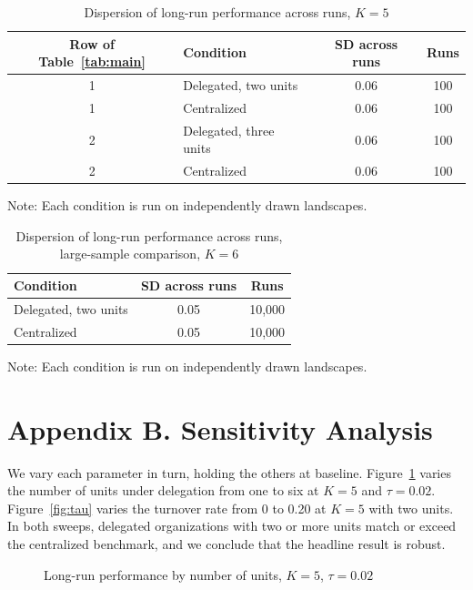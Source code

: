 \documentclass[11pt]{article}
\begin{document}
\begin{table}[h]
\centering
\caption{Dispersion of long-run performance across runs, $K = 5$}
\label{tab:sd}
\begin{tabular}{clcc}
\toprule
Row of Table~\ref{tab:main} & Condition & SD across runs & Runs \\
\midrule
1 & Delegated, two units & 0.06 & 100 \\
1 & Centralized & 0.06 & 100 \\
2 & Delegated, three units & 0.06 & 100 \\
2 & Centralized & 0.06 & 100 \\
\bottomrule
\end{tabular}

\smallskip
\footnotesize Note: Each condition is run on independently drawn landscapes.
\end{table}

\begin{table}[h]
\centering
\caption{Dispersion of long-run performance across runs, large-sample comparison, $K = 6$}
\label{tab:sdlarge}
\begin{tabular}{lcc}
\toprule
Condition & SD across runs & Runs \\
\midrule
Delegated, two units & 0.05 & 10,000 \\
Centralized & 0.05 & 10,000 \\
\bottomrule
\end{tabular}

\smallskip
\footnotesize Note: Each condition is run on independently drawn landscapes.
\end{table}

\clearpage
\section*{Appendix B. Sensitivity Analysis}

We vary each parameter in turn, holding the others at baseline. Figure~\ref{fig:units} varies the number of units under delegation from one to six at $K = 5$ and $\tau = 0.02$. Figure~\ref{fig:tau} varies the turnover rate from 0 to 0.20 at $K = 5$ with two units. In both sweeps, delegated organizations with two or more units match or exceed the centralized benchmark, and we conclude that the headline result is robust.

\begin{figure}[h]
\centering
{}
\caption{Long-run performance by number of units, $K = 5$, $\tau = 0.02$}
\label{fig:units}
\end{figure}
\end{document}
